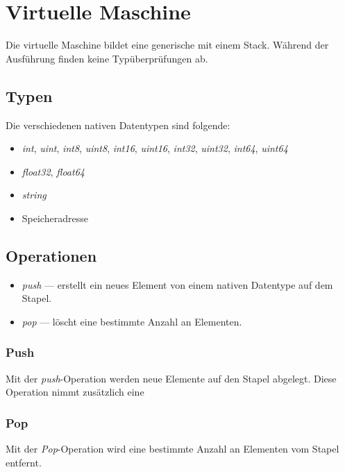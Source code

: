 \chapter{Virtuelle Maschine}
Die virtuelle Maschine bildet eine generische mit einem Stack. Während der Ausführung finden keine Typüberprüfungen ab.

\section{Typen}
Die verschiedenen nativen Datentypen sind folgende:
\begin{itemize}
\item \textit{int}, \textit{uint}, \textit{int8}, \textit{uint8}, \textit{int16}, \textit{uint16}, \textit{int32}, \textit{uint32}, \textit{int64}, \textit{uint64}
\item \textit{float32}, \textit{float64}
\item \textit{string}
\item Speicheradresse
\end{itemize}

\section{Operationen}
\begin{itemize}
\item \textit{push} --- erstellt ein neues Element von einem nativen Datentype auf dem Stapel.
\item \textit{pop} --- löscht eine bestimmte Anzahl an Elementen.
\end{itemize}

\subsection{Push}
Mit der \textit{push}-Operation werden neue Elemente auf den Stapel abgelegt. Diese Operation nimmt zusätzlich eine 

\subsection{Pop}
Mit der \textit{Pop}-Operation wird eine bestimmte Anzahl an Elementen vom Stapel entfernt.


